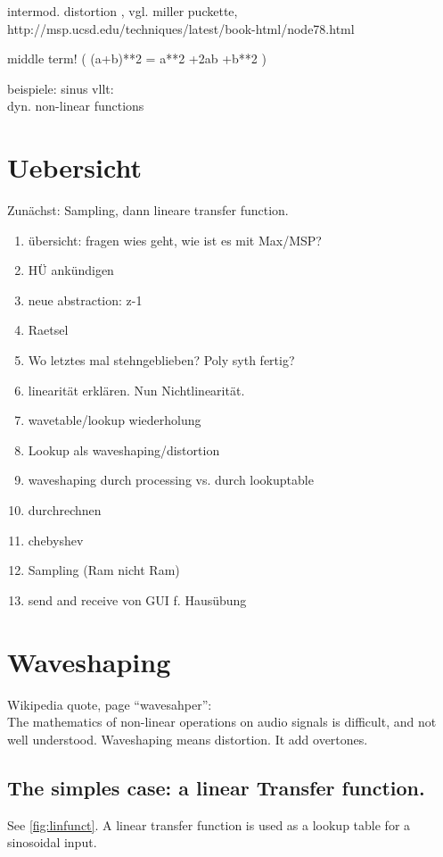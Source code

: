 \glqq{}intermod. distortion \grqq{} , vgl. miller puckette, \\
http://msp.ucsd.edu/techniques/latest/book-html/node78.html

middle term! ( (a+b)**2 = a**2 +2ab +b**2 )




beispiele:
sinus
vllt:\\
dyn. non-linear functions




\section{Uebersicht}
Zunächst: Sampling, dann lineare transfer function.

\begin{enumerate}
	\item übersicht: fragen wies geht, wie ist es mit Max/MSP?
	\item HÜ ankündigen
	\item neue abstraction: z-1
	\item Raetsel
	\item Wo letztes mal stehngeblieben? Poly syth fertig?
	\item linearität erklären. Nun Nichtlinearität.
	\item wavetable/lookup wiederholung
	\item Lookup als waveshaping/distortion
	\item waveshaping durch processing vs. durch lookuptable
	\item durchrechnen
	\item chebyshev
	\item Sampling (Ram nicht Ram)
	\item send and receive von GUI f. Hausübung
\end{enumerate}

\section{Waveshaping}
Wikipedia quote, page ``wavesahper'':\\
\glqq{}The mathematics of non-linear operations on audio signals is difficult, and not well understood.\grqq{}
Waveshaping means distortion. It add overtones.


\subsection{The simples case: a linear Transfer function. } %
\label{sub:linearTrans}
See \ref{fig:linfunct}. A linear transfer function is used as a lookup table for a sinosoidal input.

